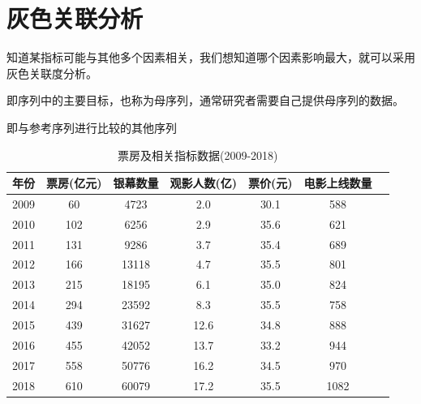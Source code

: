 \section{灰色关联分析}

\begin{definition}[灰色关联分析]
    知道某指标可能与其他多个因素相关，我们想知道哪个因素影响最大，就可以采用灰色关联度分析。
\end{definition}

\begin{definition}[参考序列]
    即序列中的主要目标，也称为母序列，通常研究者需要自己提供母序列的数据。
\end{definition}

\begin{definition}[比较序列]
    即与参考序列进行比较的其他序列
\end{definition}

\begin{example}
    \begin{table}[htbp]
        \centering
        \caption{票房及相关指标数据(2009-2018)}
        \begin{tabular}{ccccccc}
            \toprule
            年份   & 票房(亿元) & 银幕数量  & 观影人数(亿) & 票价(元) & 电影上线数量 \\
            \midrule
            2009 & 60     & 4723  & 2.0     & 30.1  & 588    \\
            2010 & 102    & 6256  & 2.9     & 35.6  & 621    \\
            2011 & 131    & 9286  & 3.7     & 35.4  & 689    \\
            2012 & 166    & 13118 & 4.7     & 35.5  & 801    \\
            2013 & 215    & 18195 & 6.1     & 35.0  & 824    \\
            2014 & 294    & 23592 & 8.3     & 35.5  & 758    \\
            2015 & 439    & 31627 & 12.6    & 34.8  & 888    \\
            2016 & 455    & 42052 & 13.7    & 33.2  & 944    \\
            2017 & 558    & 50776 & 16.2    & 34.5  & 970    \\
            2018 & 610    & 60079 & 17.2    & 35.5  & 1082   \\
            \bottomrule
        \end{tabular}
        \label{tab:box-office-data}
    \end{table}
\end{example}

